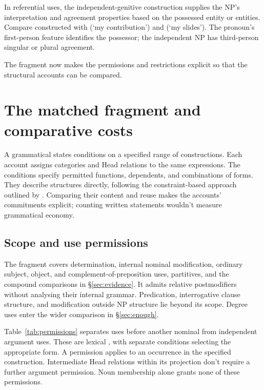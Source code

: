 \documentclass[12pt]{article}
\begin{document}
In referential uses, the independent-genitive construction supplies the NP's interpretation and agreement properties based on the possessed entity or entities. Compare constructed  with  (\enquote*{my contribution}) and  (\enquote*{my slides}). The pronoun's first-person feature identifies the possessor; the independent NP has third-person singular or plural agreement.

The fragment now makes the permissions and restrictions explicit so that the structural accounts can be compared.

\section{The matched fragment and comparative costs}\label{sec:economy}

A grammatical  states conditions on a specified range of constructions. Each account assigns categories and Head relations to the same expressions. The conditions specify permitted functions, dependents, and combinations of forms. They describe structures directly, following the constraint-based approach outlined by \textcite{pullum2020theorizing}. Comparing their content and reuse makes the accounts' commitments explicit; counting written statements wouldn't measure grammatical economy.

\subsection{Scope and use permissions}\label{sec:fragment}

The fragment covers determination, internal nominal modification, ordinary subject, object, and complement-of-preposition uses, partitives, and the compound comparisons in §\ref{sec:evidence}. It admits relative postmodifiers without analysing their internal grammar. Predication, interrogative clause structure, and modification outside NP structure lie beyond its scope. Degree uses enter the wider comparison in §\ref{sec:enough}.

Table~\ref{tab:permissions} separates uses before another nominal from independent argument uses. These are lexical , with separate conditions selecting the appropriate form. A permission applies to an occurrence in the specified construction. Intermediate Head relations within its projection don't require a further argument permission. Noun membership alone grants none of these permissions.
\end{document}
